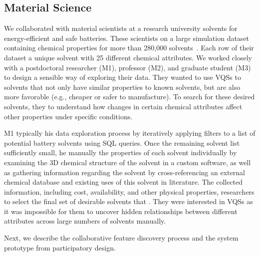  \subsection{Material Science}
 \par\noindent{} 
 \npar We collaborated with material scientists at a research university  solvents for energy-efficient and safe batteries. These scientists  on a large simulation dataset containing chemical properties for more than 280,000 solvents~\cite{Khetan2018}. Each row of their dataset  a unique solvent with 25 different chemical attributes. We worked closely with a postdoctoral researcher (M1), professor (M2), and graduate student (M3) to design a sensible way of exploring their data. They wanted to use VQSs to  solvents that not only have similar properties to known solvents, but are also more favorable (e.g., cheaper or safer to manufacture). To search for these desired solvents, they  to understand how changes in certain chemical attributes affect other properties under specific conditions.
 \par\noindent{} 
 \npar M1 typically  his data exploration process by iteratively applying filters to a list of potential battery solvents using SQL queries. Once the remaining solvent list  sufficiently small, he manually  the properties of each solvent individually by examining the 3D chemical structure of the solvent in a custom software, as well as gathering information regarding the solvent by cross-referencing an external chemical database and existing uses of this solvent in literature. The collected information, including cost, availability, and other physical properties,  researchers to select the final set of desirable solvents that . They were interested in VQSs as it was impossible for them to uncover hidden relationships between different attributes across large numbers of solvents manually.%
 \par Next, we describe the collaborative feature discovery process and the system prototype from participatory design.
 